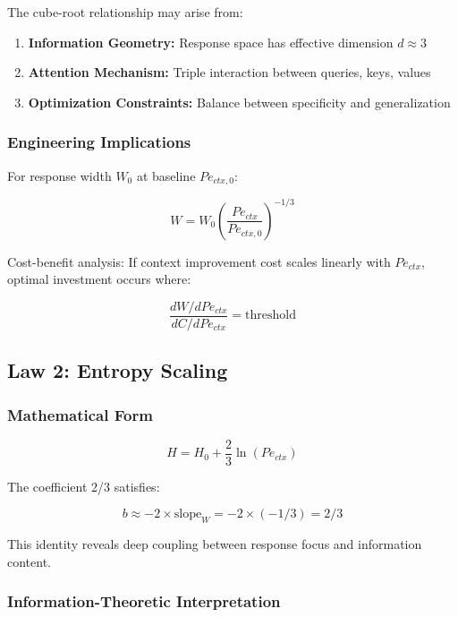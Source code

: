 \documentclass[conference]{IEEEtran}
\begin{document}
The cube-root relationship may arise from:
\begin{enumerate}
\item \textbf{Information Geometry:} Response space has effective dimension $d \approx 3$
\item \textbf{Attention Mechanism:} Triple interaction between queries, keys, values
\item \textbf{Optimization Constraints:} Balance between specificity and generalization
\end{enumerate}

\subsubsection{Engineering Implications}

For response width $W_0$ at baseline $Pe_{ctx,0}$:

\begin{equation}
W = W_0 \left(\frac{Pe_{ctx}}{Pe_{ctx,0}}\right)^{-1/3}
\end{equation}

Cost-benefit analysis: If context improvement cost scales linearly with $Pe_{ctx}$, optimal investment occurs where:

\begin{equation}
\frac{dW/dPe_{ctx}}{dC/dPe_{ctx}} = \text{threshold}
\end{equation}

\subsection{Law 2: Entropy Scaling}

\subsubsection{Mathematical Form}

\begin{equation}
H = H_0 + \frac{2}{3}\ln(Pe_{ctx})
\end{equation}

The coefficient 2/3 satisfies:

\begin{equation}
b \approx -2 \times \text{slope}_W = -2 \times (-1/3) = 2/3
\end{equation}

This identity reveals deep coupling between response focus and information content.

\subsubsection{Information-Theoretic Interpretation}
\end{document}
